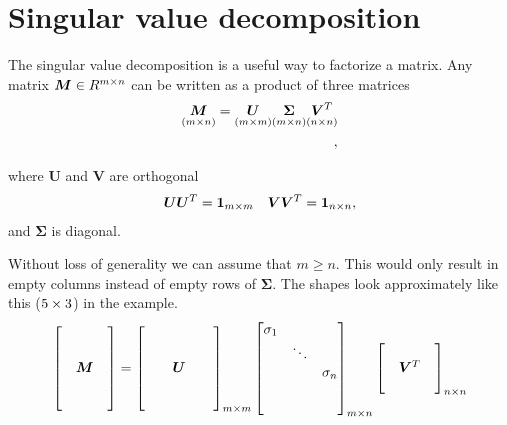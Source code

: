    

    \section{Singular value decomposition}
    The singular value decomposition is a useful way to factorize a matrix. 
    Any matrix $\bm{M} \in R^{m \times n}$ can be written as a product of three matrices
    \begin{align}
        \underset{(m \times n)}{\bm{M}}  = \underset{(m \times m)}{\bm{U}}\underset{(m \times n)}{\bm{\Sigma}} \underset{(n \times n)}{\bm{V}^T}\\,
    \end{align}
    
    where $\bm{U}$ and $\bm{V}$ are orthogonal 
    \begin{align}
        \bm{UU}^T = \bm{1}_{m \times m} && \bm{VV}^T = \bm{1}_{n \times n},
    \end{align}
    and $\bm{\Sigma}$ is diagonal.
    
    Without loss of generality we can assume that $m \geq n$. This would only result in empty columns instead of empty rows of $\bm{\Sigma}$.
    The shapes look approximately like this ($5 \times 3$) in the example.
    \begin{align}
        \begin{bmatrix}
        &        & \\
        &        & \\
        & \bm{M} & \\
        &        & \\
        &        & 
        \end{bmatrix}    = 
        \begin{bmatrix}
        & &        & & \\
        & &        & & \\
        & & \bm{U} & & \\
        & &        & & \\
        & &        & & 
        \end{bmatrix}_{m \times m}
        \begin{bmatrix}
        \sigma_1 &        &          \\
                 & \ddots &          \\
                 &        & \sigma_n \\
                 &        &          \\
                 &        &          
        \end{bmatrix}_{m \times n}
        \begin{bmatrix}
            &          & \\
            & \bm{V}^T & \\
            &          &  
        \end{bmatrix}_{n \times n}
    \end{align}
    
